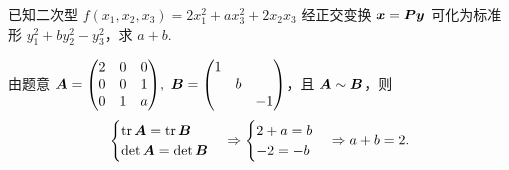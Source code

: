 \begin{example}
    已知二次型 $f(x_1,x_2,x_3)=2x_1^2+ax_3^2+2x_2x_3$ 经正交变换 $\vb*{x}=\vb*{Py}$ 可化为标准形 $y_1^2+by_2^2-y_3^2$，求 $a+b.$
\end{example}
\begin{solution}
    由题意 $\vb*{A}=\mqty(2&0&0\\0&0&1\\0&1&a),~\vb*{B}=\mqty(\dmat{1,b,-1})$，且 $\vb*{A}\sim\vb*{B}$，则
    $$\begin{cases}
            \tr\vb*{A}=\tr\vb*{B}   \\
            \det\vb*{A}=\det\vb*{B} \\
        \end{cases}\Rightarrow\begin{cases}
            2+a=b \\-2=-b
        \end{cases}\Rightarrow a+b=2.$$
\end{solution}


